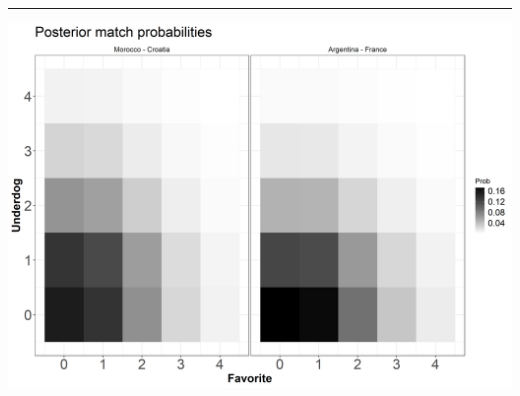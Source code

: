 \documentclass[
  10pt,
]{article}
\begin{document}
\begin{center}\rule{0.5\linewidth}{0.5pt}\end{center}

\begin{center}\includegraphics[width=0.8\linewidth]{figs/data2-1} \end{center}
\end{document}
